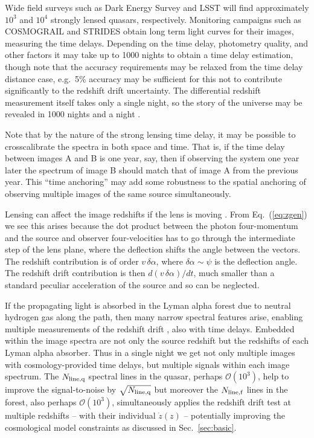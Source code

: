\documentclass[preprint2, 10pt]{aastex}
\begin{document}
Wide field surveys such as Dark Energy Survey and LSST will find 
approximately $10^3$ and $10^4$ strongly lensed quasars, respectively.  
Monitoring 
campaigns such as COSMOGRAIL \citep{cosmograil} and STRIDES \citep{strides} 
obtain long term light curves for their images, measuring the time 
delays.  Depending on the time delay, photometry quality, and other 
factors it may take up to 1000 nights to obtain a time delay 
estimation, though note that the accuracy requirements may be relaxed 
from the time delay distance case, e.g.\ 5\% accuracy may be sufficient 
for this not to contribute significantly to the redshift drift uncertainty. 
The differential redshift measurement itself takes only a single night, 
so the story of the universe may be revealed in 1000 nights and a night 
\citep{1001}. 

Note that by the nature of the strong lensing time delay, it may be possible 
to crosscalibrate the spectra in both space and time.  That is, if the time 
delay between images A and B is one year, say, then if observing the system 
one year later the spectrum of image B should match that of image A from 
the previous year.  This ``time anchoring'' may add some robustness to 
the spatial anchoring of observing multiple images of the same source 
simultaneously. 

Lensing can affect the image redshifts if the lens is moving 
\citep{mitrofanov,birkgull}.  From 
Eq.~(\ref{eq:zgen}) we see this arises because the dot product between 
the photon four-momentum and the source and observer four-velocities 
has to go through the intermediate step of the lens plane, where the 
deflection shifts the angle between the vectors.  The redshift contribution 
is of order $v\,\delta\alpha$, where $\delta\alpha\sim\psi$ is the 
deflection angle.  The redshift drift contribution is then 
$d(v\,\delta\alpha)/dt$, much smaller than a standard peculiar 
acceleration of the source and so can be neglected. 

If the propagating light is 
absorbed in the Lyman alpha forest due to neutral hydrogen gas along 
the path, then many narrow spectral features arise, enabling multiple 
measurements of the redshift drift 
\citep{1998ApJ...499L.111L,2008MNRAS.386.1192L}, 
also with time delays. 
Embedded within the image spectra are not only the source redshift but 
the redshifts of each Lyman alpha absorber.  Thus in a single night we get 
not only multiple images with cosmology-provided time delays, but multiple 
signals within each image spectrum.  The $N_{\rm line,q}$ spectral lines 
in the quasar, perhaps ${\mathcal O}(10^3)$, help to improve the 
signal-to-noise by $\sqrt{N_{\rm line,q}}$ but moreover the 
$N_{\rm line,f}$ lines in the forest, also perhaps ${\mathcal O}(10^3)$, 
simultaneously applies the redshift drift test at multiple redshifts 
-- with their individual $\dot z(z)$ -- potentially improving the cosmological 
model constraints as discussed in Sec.~\ref{sec:basic}. 
\end{document}
